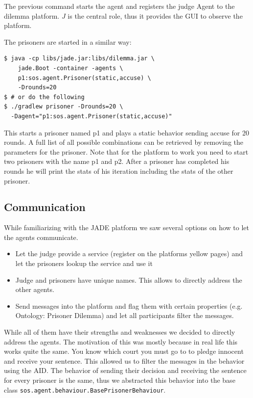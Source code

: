 \documentclass{acm_proc_article-sp}
\begin{document}
The previous command starts the agent and registers the judge Agent to the dilemma platform.
$J$ is the central role, thus it provides the GUI to observe the platform.

The prisoners are started in a similar way:

\begin{lstlisting}
$ java -cp libs/jade.jar:libs/dilemma.jar \
    jade.Boot -container -agents \
    p1:sos.agent.Prisoner(static,accuse) \
    -Drounds=20
$ # or do the following
$ ./gradlew prisoner -Drounds=20 \
  -Dagent="p1:sos.agent.Prisoner(static,accuse)"
\end{lstlisting}

This starts a prisoner named p1 and plays a static behavior sending accuse for 20 rounds.
A full list of all possible combinations can be retrieved by removing the parameters for
the prisoner. Note that for the platform to work you need to start two prisoners
with the name p1 and p2. After a prisoner has completed his rounds he will print
the stats of his iteration including the stats of the other prisoner.

\subsection{Communication}

While familiarizing with the JADE platform we saw several options
on how to let the agents communicate.

\begin{itemize}
	\item Let the judge provide a service (register on the platforms yellow pages) and let
    the prisoners lookup the service and use it
    \item Judge and prisoners have unique names. This allows to directly address the other
    agents.
    \item Send messages into the platform and flag them with certain properties (e.g. Ontology: Prisoner Dilemma) and let all participants filter the messages.
\end{itemize}

While all of them have their strengths and weaknesses we decided to directly address the agents.
The motivation of this was mostly because in real life this works quite the same. You
know which court you must go to to pledge innocent and receive your sentence. This allowed
us to filter the messages in the behavior using the AID. The behavior of sending their
decision and receiving the sentence for every prisoner is the same,
thus we abstracted this behavior into the base class \lstinline!sos.agent.behaviour.BasePrisonerBehaviour!.
\end{document}
